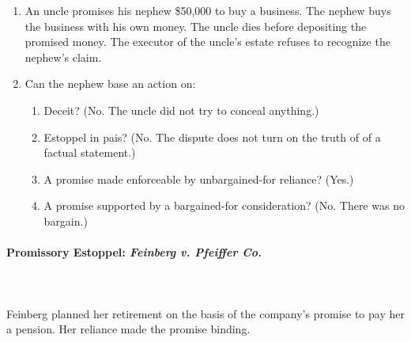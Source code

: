 \begin{enumerate}
    \item An uncle promises his nephew \$50,000 to buy a business. The nephew 
    buys the business with his own money. The uncle dies before depositing the 
    promised money. The executor of the uncle's estate refuses to recognize 
    the nephew's claim.
    \item Can the nephew base an action on:
    \begin{enumerate}
        \item Deceit? (No. The uncle did not try to conceal anything.)
        \item Estoppel in pais? (No. The dispute does not turn on the truth of
        of a factual statement.)
        \item A promise made enforceable by unbargained-for reliance? (Yes.)
        \item A promise supported by a bargained-for consideration? (No. There 
        was no bargain.)
    \end{enumerate}
\end{enumerate}

\paragraph{Promissory Estoppel: \emph{Feinberg v. Pfeiffer Co.}}
~\\\\
Feinberg planned her retirement on the basis of the company's promise to pay 
her a pension. Her reliance made the promise binding.

